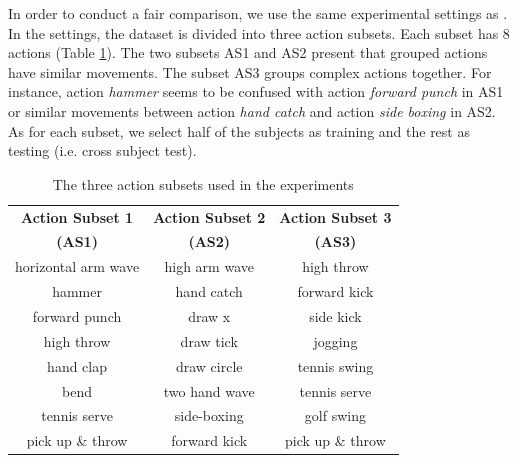 \documentclass[review]{elsarticle}
\begin{document}
In order to conduct a fair comparison, we use the same experimental settings as \cite{li2010action, yang2012eigenjoints, yang2012recognizing, wang2012mining, xia2013spatio, oreifej2013hon4d}. In the settings, the dataset is divided into three action subsets. Each subset has 8 actions (Table \ref{lbl:3ActionSubsets}). The two subsets AS1 and AS2 present that grouped actions have similar movements. The subset AS3 groups complex actions together. For instance, action \textit{hammer} seems to be confused with action \textit{forward punch} in AS1 or similar movements between action \textit{hand catch} and action \textit{side boxing} in AS2. As for each subset, we select half of the subjects as training and the rest as testing (i.e. cross subject test).

\begin{table}[H]
	\begin{center}
		\begin{tabular}{c|c|c}
		
		{\bf Action Subset 1} & {\bf Action Subset 2} & {\bf Action Subset 3} \\
		{\bf(AS1)} & {\bf(AS2)} & {\bf(AS3)} \\
		\hline
		horizontal arm wave &  high arm wave &     high throw \\
		
		        hammer &     hand catch &   forward kick \\
		
		 forward punch &         draw x &      side kick \\
		
		    high throw &      draw tick &        jogging \\
		
		     hand clap &    draw circle &   tennis swing \\
		
		          bend &  two hand wave &   tennis serve \\
		
		  tennis serve &    side-boxing &     golf swing \\
		
		pick up \& throw &   forward kick & pick up \& throw \\
		
		\end{tabular}
	\end{center}
	\caption{\label{lbl:3ActionSubsets}The three action subsets used in the experiments}
\end{table}
\end{document}
